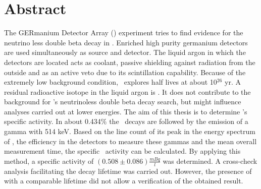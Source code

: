 \documentclass[encoding=utf8,british]{tumphthesis}
\begin{document}



\chapter*{Abstract}
The GERmanium Detector Array (\gerda) experiment tries to find evidence for the neutrino less double beta decay in .
Enriched high purity germanium detectors are used simultaneously as source and detector.
The liquid argon in which the detectors are located acts as coolant, passive shielding against radiation from the outside and as an active veto due to its scintillation capability.
Because of the extremely low background condition, \gerda\ explores half lives at about 10$^{26}$ yr.
A residual radioactive isotope in the liquid argon is .
It does not contribute to the background for \gerda's neutrinoless double beta decay search, but might influence analyses carried out at lower energies.
The aim of this thesis is to determine \Kr's specific activity.
In about 0.434$\%$ the \Kr\ decays are followed by the emission of a gamma with 514 keV.
Based on the line count of its peak in the energy spectrum of \gerda, the efficiency in the detectors to measure these gammas and the mean overall measurement time, the specific \Kr\ activity can be calculated.
By applying this method, a specific activity of $(0.508\pm0.086)\frac{\unit{mBq}}{\unit{l}}$ was determined.
A cross-check analysis facilitating the decay lifetime was carried out.
However, the presence of  with a comparable lifetime did not allow a verification of the obtained result.
\end{document}

